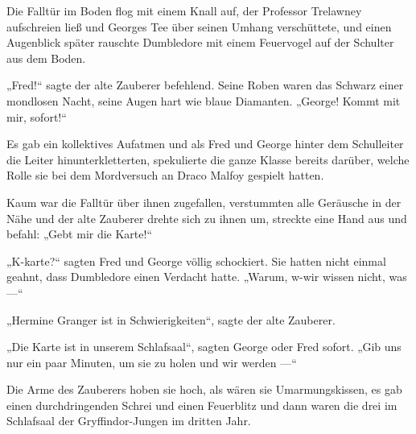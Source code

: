 Die Falltür im Boden flog mit einem Knall auf, der Professor Trelawney aufschreien ließ und Georges Tee über seinen Umhang verschüttete, und einen Augenblick später rauschte Dumbledore mit einem Feuervogel auf der Schulter aus dem Boden.

„Fred!“ sagte der alte Zauberer befehlend. Seine Roben waren das Schwarz einer mondlosen Nacht, seine Augen hart wie blaue Diamanten.
„George! Kommt mit mir, sofort!“

Es gab ein kollektives Aufatmen und als Fred und George hinter dem Schulleiter die Leiter hinunterkletterten, spekulierte die ganze Klasse bereits darüber, welche Rolle sie bei dem Mordversuch an Draco Malfoy gespielt hatten.

Kaum war die Falltür über ihnen zugefallen, verstummten alle Geräusche in der Nähe und der alte Zauberer drehte sich zu ihnen um, streckte eine Hand aus und befahl:
„Gebt mir die Karte!“

„K-karte?“ sagten Fred und George völlig schockiert. Sie hatten nicht einmal geahnt, dass Dumbledore einen Verdacht hatte.
„Warum, w-wir wissen nicht, was —“

„Hermine Granger ist in Schwierigkeiten“, sagte der alte Zauberer.

„Die Karte ist in unserem Schlafsaal“, sagten George oder Fred sofort.
„Gib uns nur ein paar Minuten, um sie zu holen und wir werden —“

Die Arme des Zauberers hoben sie hoch, als wären sie Umarmungskissen, es gab einen durchdringenden Schrei und einen Feuerblitz und dann waren die drei im Schlafsaal der Gryffindor-Jungen im dritten Jahr.


